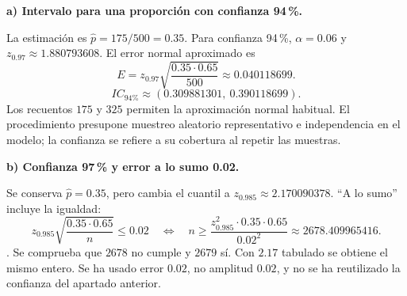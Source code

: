 \textbf{a) Intervalo para una proporción con confianza 94\,\%.}\par\nopagebreak[4]
La estimación es $\widehat p=175/500=0.35$. Para confianza 94\,\%, $\alpha=0.06$ y $z_{0.97}\approx1.880793608$. El error normal aproximado es
\[
E=z_{0.97}\sqrt{\frac{0.35\cdot0.65}{500}}\approx0.040118699.
\]
\[
\boxed{IC_{\text{94\%}}\approx(0.309881301,\ 0.390118699).}
\]
Los recuentos $175$ y $325$ permiten la aproximación normal habitual. El procedimiento presupone muestreo aleatorio representativo e independencia en el modelo; la confianza se refiere a su cobertura al repetir las muestras.

\textbf{b) Confianza 97\,\% y error a lo sumo 0.02.}\par\nopagebreak[4]
Se conserva $\widehat p=0.35$, pero cambia el cuantil a $z_{0.985}\approx2.170090378$. ``A lo sumo'' incluye la igualdad:
\[
z_{0.985}\sqrt{\frac{0.35\cdot0.65}{n}}\leq0.02
\quad\Longleftrightarrow\quad
n\geq\frac{z_{0.985}^2\cdot0.35\cdot0.65}{0.02^2}
\approx2678.409965416.
\]
. Se comprueba que $2678$ no cumple y $2679$ sí. Con $2.17$ tabulado se obtiene el mismo entero. Se ha usado error $0.02$, no amplitud $0.02$, y no se ha reutilizado la confianza del apartado anterior.
